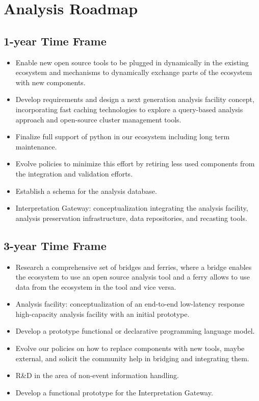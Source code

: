 \documentclass[12pt,a4paper]{article}
\begin{document}
\section{Analysis Roadmap}

\subsection{1-year Time Frame}

\begin{itemize}
\item Enable new open source tools to be plugged in dynamically in the existing ecosystem and mechanisms to dynamically exchange parts of the ecosystem with new components.
\item Develop requirements and design a next generation analysis facility concept, incorporating fast caching technologies to explore a query-based analysis approach and open-source cluster management tools.
\item Finalize full support of python in our ecosystem including long term maintenance.
\item Evolve policies to minimize this effort by retiring less used components from the integration and validation efforts.
\item Establish a schema for the analysis database.
\item Interpretation Gateway: conceptualization integrating the analysis facility, analysis preservation infrastructure, data repositories, and recasting tools. 
\end{itemize}

\subsection{3-year Time Frame}

\begin{itemize}
\item Research a comprehensive set of bridges and ferries, where a bridge enables the ecosystem to use an open source analysis tool and a ferry allows to use data from the ecosystem in the tool and vice versa.
\item Analysis facility: conceptualization of an end-to-end low-latency response high-capacity analysis facility with an initial prototype.
\item Develop a prototype functional or declarative programming language model.
\item Evolve our policies on how to replace components with new tools, maybe external, and solicit the community help in bridging and integrating them.
\item R\&D in the area of non-event information handling.
\item Develop a functional prototype for the Interpretation Gateway.
\end{itemize}
\end{document}
